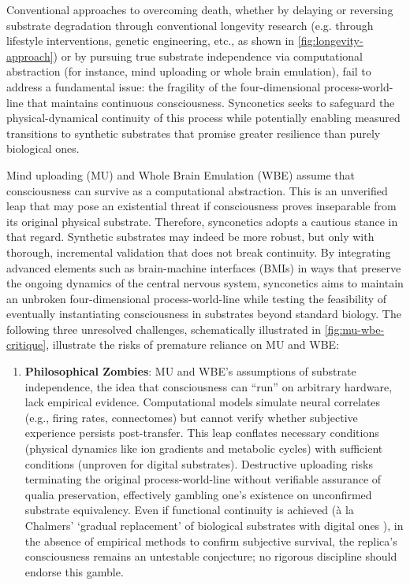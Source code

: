 \documentclass[10pt]{article}
\begin{document}
\begin{sloppypar}
  Conventional approaches to overcoming death, whether by delaying or reversing substrate degradation through conventional longevity research (e.g. through lifestyle interventions, genetic engineering, etc., as shown in \autoref{fig:longevity-approach}) or by pursuing true substrate independence via computational abstraction (for instance, mind uploading or whole brain emulation), fail to address a fundamental issue: the fragility of the four-dimensional process-world-line that maintains continuous consciousness. Synconetics seeks to safeguard the physical-dynamical continuity of this process while potentially enabling measured transitions to synthetic substrates that promise greater resilience than purely biological ones.

  Mind uploading (MU) and Whole Brain Emulation (WBE) assume that consciousness can survive as a computational abstraction. This is an unverified leap that may pose an existential threat if consciousness proves inseparable from its original physical substrate. Therefore, synconetics adopts a cautious stance in that regard. Synthetic substrates may indeed be more robust, but only with thorough, incremental validation that does not break continuity. By integrating advanced elements such as brain-machine interfaces (BMIs) in ways that preserve the ongoing dynamics of the central nervous system, synconetics aims to maintain an unbroken four-dimensional process-world-line while testing the feasibility of eventually instantiating consciousness in substrates beyond standard biology. The following three unresolved challenges, schematically illustrated in \autoref{fig:mu-wbe-critique}, illustrate the risks of premature reliance on MU and WBE:

  \begin{enumerate}
    \item \textbf{Philosophical Zombies}: MU and WBE’s assumptions of substrate independence, the idea that consciousness can “run” on arbitrary hardware, lack empirical evidence. Computational models simulate neural correlates (e.g., firing rates, connectomes) but cannot verify whether subjective experience persists post-transfer. This leap conflates necessary conditions (physical dynamics like ion gradients and metabolic cycles) with sufficient conditions (unproven for digital substrates). Destructive uploading risks terminating the original process-world-line without verifiable assurance of qualia preservation, effectively gambling one’s existence on unconfirmed substrate equivalency. Even if functional continuity is achieved (à la Chalmers’ ‘gradual replacement’ of biological substrates with digital ones \citep{chalmers_conscious_1998}), in the absence of empirical methods to confirm subjective survival, the replica’s consciousness remains an untestable conjecture; no rigorous discipline should endorse this gamble.


\end{enumerate}
\end{sloppypar}
\end{document}
